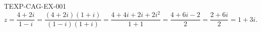 \begin{corrige}{TEXP-CAG-EX-001}
\[
  z = \frac{4+2i}{1-i} = \frac{(4+2i)(1+i)}{(1-i)(1+i)} = \frac{4+4i+2i+2i^2}{1+1} = \frac{4+6i-2}{2} = \frac{2+6i}{2} = 1+3i.
\]
\end{corrige}
